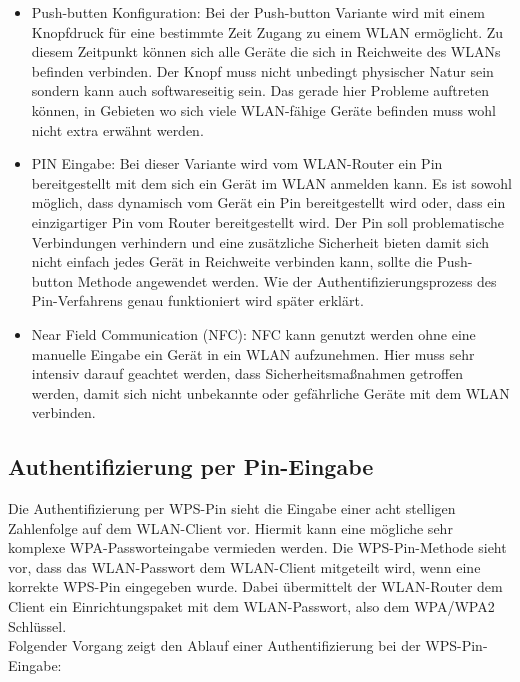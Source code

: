 \begin{itemize}
	\item Push-butten Konfiguration: Bei der Push-button Variante wird mit einem Knopfdruck für eine bestimmte Zeit Zugang zu einem WLAN ermöglicht. Zu diesem Zeitpunkt können sich alle Geräte die sich in Reichweite des WLANs befinden verbinden. Der Knopf muss nicht unbedingt physischer Natur sein sondern kann auch softwareseitig sein. Das gerade hier Probleme auftreten können, in Gebieten wo sich viele WLAN-fähige Geräte befinden muss wohl nicht extra erwähnt werden.

	\item PIN Eingabe: Bei dieser Variante wird vom WLAN-Router ein Pin bereitgestellt mit dem sich ein Gerät im WLAN anmelden kann. Es ist sowohl möglich, dass dynamisch vom Gerät ein Pin bereitgestellt wird oder, dass ein einzigartiger Pin vom Router bereitgestellt wird. Der Pin soll problematische Verbindungen verhindern und eine zusätzliche Sicherheit bieten damit sich nicht einfach jedes Gerät in Reichweite verbinden kann, sollte die Push-button Methode angewendet werden. Wie der Authentifizierungsprozess des Pin-Verfahrens genau funktioniert wird später erklärt.

	\item Near Field Communication (NFC): NFC kann genutzt werden ohne eine manuelle Eingabe ein Gerät in ein WLAN aufzunehmen. Hier muss sehr intensiv darauf geachtet werden, dass Sicherheitsmaßnahmen getroffen werden, damit sich nicht unbekannte oder gefährliche Geräte mit dem WLAN verbinden.
\end{itemize}

\subsection{Authentifizierung per Pin-Eingabe}

Die Authentifizierung per WPS-Pin sieht die Eingabe einer acht stelligen Zahlenfolge auf dem WLAN-Client vor. Hiermit kann eine mögliche sehr komplexe WPA-Passworteingabe vermieden werden. Die WPS-Pin-Methode sieht vor, dass das WLAN-Passwort dem WLAN-Client mitgeteilt wird, wenn eine korrekte WPS-Pin eingegeben wurde. Dabei übermittelt der WLAN-Router dem Client ein Einrichtungspaket mit dem WLAN-Passwort, also dem WPA/WPA2 Schlüssel. \\
Folgender Vorgang zeigt den Ablauf einer Authentifizierung bei der WPS-Pin-Eingabe:

